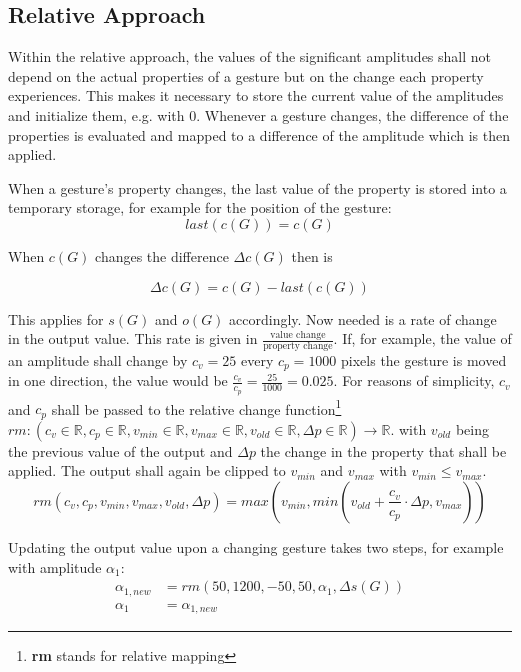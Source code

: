 \subsection{Relative Approach}
\label{sec:app:rel}
Within the relative approach, the values of the significant amplitudes shall not depend on the actual properties of a gesture but on the change each property experiences. This makes it necessary to store the current value of the amplitudes and initialize them, e.g. with 0. Whenever a gesture changes, the difference of the properties is evaluated and mapped to a difference of the amplitude which is then applied.

When a gesture's property changes, the last value of the property is stored into a temporary storage, for example for the position of the gesture:
\begin{equation*}
last(c(G)) = c(G)
\end{equation*}

When $c(G)$ changes the difference $\Delta c(G)$ then is

\begin{equation*}
\Delta c(G) = c(G) - last(c(G))
\end{equation*}

This applies for $s(G)$ and $o(G)$ accordingly. Now needed is a rate of change in the output value. This rate is given in $\frac{\text{value change}}{\text{property change}}$. If, for example, the value of an amplitude shall change by $c_v = 25$ every $c_p = 1000$ pixels the gesture is moved in one direction, the value would be $\frac{c_v}{c_p} = \frac{25}{1000} = 0.025$. For reasons of simplicity, $c_v$ and $c_p$ shall be passed to the relative change function\footnote{\textbf{rm} stands for relative mapping} $rm:(c_v \in \mathbb{R}, c_p \in \mathbb{R}, v_{min} \in \mathbb{R}, v_{max} \in \mathbb{R}, v_{old} \in \mathbb{R}, \Delta p \in \mathbb{R}) \rightarrow \mathbb{R}$. with $v_{old}$ being the previous value of the output and $\Delta p$ the change in the property that shall be applied. The output shall again be clipped to $v_{min}$ and $v_{max}$ with $v_{min} \leq v_{max}$.
\begin{equation}
rm(c_v, c_p, v_{min}, v_{max}, v_{old}, \Delta p) = max(v_{min}, min(v_{old} + \frac{c_v}{c_p} \cdot \Delta p, v_{max}))
\end{equation}

Updating the output value upon a changing gesture takes two steps, for example with amplitude $\alpha_1$:
\begin{align*}
\alpha_{1,new} &= rm(50, 1200, -50, 50, \alpha_1, \Delta s(G)) \\
\alpha_1 &= \alpha_{1,new}
\end{align*}

